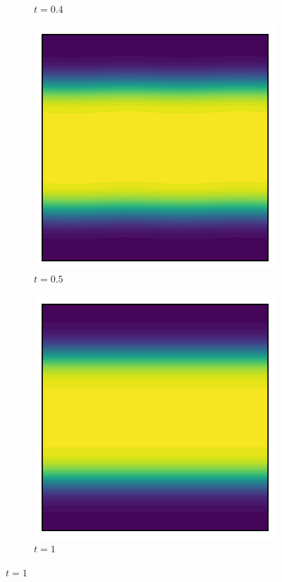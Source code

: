 \documentclass{article} %
\begin{document}
\begin{figure}[!h]
\begin{subfigure}[b]{0.2\textwidth}
        \caption*{$t = 0.4$}
        \label{fig:image6}
    \end{subfigure}
    \hfill
    \begin{subfigure}[b]{0.2\textwidth}
        \includegraphics[width=\textwidth]{phi_0.5.pdf}
        \caption*{$t = 0.5$}
        \label{fig:image7}
    \end{subfigure}
    \hfill
    \begin{subfigure}[b]{0.2\textwidth}
        \includegraphics[width=\textwidth]{phi_1.pdf}
        \caption*{$t = 1$}
        \label{fig:image8}
    \end{subfigure}
    

\end{figure}
\end{document}
